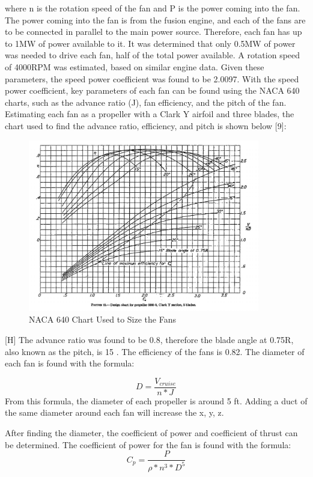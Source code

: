 \documentclass{article}
\begin{document}
where n is the rotation speed of the fan and P is the power coming into the fan. The power coming into the fan is from the fusion engine, and each of the fans are to be connected in parallel to the main power source. Therefore, each fan has up to 1MW of power available to it. It was determined that only 0.5MW of power was needed to drive each fan, half of the total power available. A rotation speed of 4000RPM was estimated, based on similar engine data. Given these parameters, the speed power coefficient was found to be 2.0097. With the speed power coefficient, key parameters of each fan can be found using the NACA 640 charts, such as the advance ratio (J), fan efficiency, and the pitch of the fan. Estimating each fan as a propeller with a Clark Y airfoil and three blades, the chart used to find the advance ratio, efficiency, and pitch is shown below [9]: 
\begin{figure}[H]
 \centering 
    \includegraphics [width = 0.90\textwidth]{Figures/NACA.png}
    \caption{NACA 640 Chart Used to Size the Fans}
    \label{fig:NACA}
\end{figure}[H]
The advance ratio was found to be 0.8, therefore the blade angle at 0.75R, also known as the pitch, is 15 {\degree}. The efficiency of the fans is 0.82. The diameter of each fan is found with the formula: 

\begin{equation}
D =\frac{ V_{cruise}}{n*J}
\end{equation}
From this formula, the diameter of each propeller is around 5 ft. Adding a duct of the same diameter around each fan will increase the x, y, z. 

After finding the diameter, the coefficient of power and coefficient of thrust can be determined. The coefficient of power for the fan is found with the formula: 
\begin{equation}
C_{p} = \frac{P}{\rho*n^{3}*D^{5}}
\end{equation}
\end{document}
